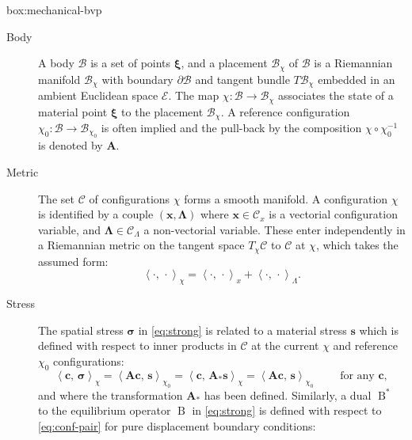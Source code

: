 \begin{ambox}{box:mechanical-bvp}
{
\begin{description}
\item[Body]
A body \(\mathcal{B}\) is a set of points \(\bm{\xi}\), and a placement
\(\mathcal{B}_\chi\) of \(\mathcal{B}\) is a Riemannian manifold
\(\mathcal{B}_\chi\) with boundary \(\partial \mathcal{B}\) and tangent
bundle \(T\mathcal{B}_\chi\) embedded in an ambient Euclidean space
\(\mathcal{E}\). The map
\(\chi\colon \mathcal{B}\rightarrow \mathcal{B}_\chi\) associates the
state of a material point \(\bm{\xi}\) to the placement
\(\mathcal{B}_\chi\). A reference configuration
\(\chi_0\colon \mathcal{B}\rightarrow \mathcal{B}_{\chi_0}\) is often
implied and the pull-back by the composition \(\chi\circ\chi_0^{-1}\) is
denoted by \(\bm{A}\).
\item[Metric]
The set \(\mathscr{C}\) of configurations \(\chi\) forms a smooth
 manifold. A configuration \(\chi\) is identified by a couple
\((\bm{x}, \bm{\Lambda})\) where \(\bm{x}\in\mathscr{C}_x\) is a
vectorial configuration variable, and
\(\bm{\Lambda}\in\mathscr{C}_{\scriptscriptstyle{\Lambda}}\) a
non-vectorial variable. These enter independently in a Riemannian metric
on the tangent space \(T_\chi\mathscr{C}\) to \(\mathscr{C}\) at
\(\chi\), which takes the assumed form: 
\begin{equation}
  \left< \cdot , \, \cdot\right>_{\chi} = \left< \cdot , \, \cdot\right>_{x} + \left< \cdot , \, \cdot\right>_{\scriptscriptstyle{\Lambda}} .
  \label{eq:conf-pair}
\end{equation}
%
\item[Stress]
The spatial stress \(\bm{\sigma}\) in \eqref{eq:strong} is related to a
material stress \(\bm{s}\) which is defined with respect to inner products 
in \(\mathscr{C}\) at the current \(\chi\) and reference
\(\chi_0\) configurations:
\begin{equation}
  \left<\bm{c},\, \bm{\sigma}\right>_{\chi}
  =\left< \bm{A}\bm{c},\, \bm{s}\right>_{\chi_0}
  = \left<\bm{c},\, \bm{A}_*\bm{s}\right>_{\chi}
  =\left< \bm{A}\bm{c},\, \bm{s}\right>_{\chi_0}\qquad\text{ for any }\bm{c},
  \label{eq:def-Astar}
\end{equation}
and where the transformation \(\bm{A}_*\) has been defined.
Similarly, a dual
\(\operatorname{B}^*\) to the equilibrium operator \(\operatorname{B}\) in
\eqref{eq:strong} is defined with respect to \eqref{eq:conf-pair} for pure displacement boundary conditions:

\end{description}}
\end{ambox}
